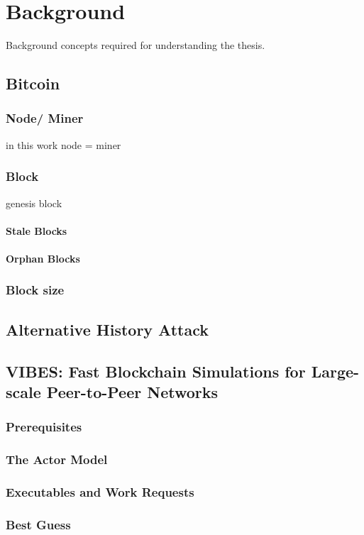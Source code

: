 \chapter{Background} 
\label{chapter:background}

Background concepts required for understanding the thesis. 

\section{Bitcoin}
\subsection{Node/ Miner}
in this work node = miner
\subsection{Block}
genesis block
\subsubsection{Stale Blocks}
\subsubsection{Orphan Blocks}
\subsection{Block size}

\section{Alternative History Attack}

\section{VIBES: Fast Blockchain Simulations for Large-scale Peer-to-Peer
Networks}
\subsection{Prerequisites}
\subsection{The Actor Model}
\subsection{Executables and Work Requests}
\subsection{Best Guess}
